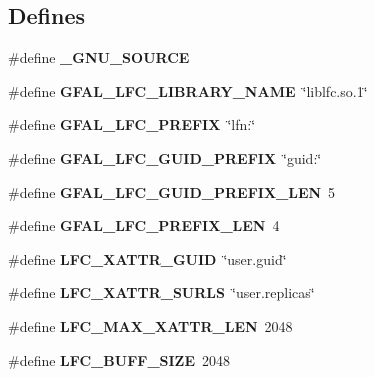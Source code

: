 \subsection*{Defines}
\begin{CompactItemize}
\item 
\#define \textbf{\_\-GNU\_\-SOURCE}\label{gfal__common__lfc_8h_53abf256730d533302d1910e5fb61efe}

\item 
\#define \textbf{GFAL\_\-LFC\_\-LIBRARY\_\-NAME}~\char`\"{}liblfc.so.1\char`\"{}\label{gfal__common__lfc_8h_7da7695351de444e2e18371bb8d6aea5}

\item 
\#define \textbf{GFAL\_\-LFC\_\-PREFIX}~\char`\"{}lfn:\char`\"{}\label{gfal__common__lfc_8h_c00d877428b39b35b4f611656b2d5215}

\item 
\#define \textbf{GFAL\_\-LFC\_\-GUID\_\-PREFIX}~\char`\"{}guid:\char`\"{}\label{gfal__common__lfc_8h_26b46ea74b4efcdd46ce519863bdc90f}

\item 
\#define \textbf{GFAL\_\-LFC\_\-GUID\_\-PREFIX\_\-LEN}~5\label{gfal__common__lfc_8h_4609690cfa23a9bb0a209f745f183c9d}

\item 
\#define \textbf{GFAL\_\-LFC\_\-PREFIX\_\-LEN}~4\label{gfal__common__lfc_8h_0f0b96660a7e6440a6556909e7195109}

\item 
\#define \textbf{LFC\_\-XATTR\_\-GUID}~\char`\"{}user.guid\char`\"{}\label{gfal__common__lfc_8h_8f6afce6b30cd0685eaa45170f52c98e}

\item 
\#define \textbf{LFC\_\-XATTR\_\-SURLS}~\char`\"{}user.replicas\char`\"{}\label{gfal__common__lfc_8h_c1963dd5788b4452446d741e07e7f417}

\item 
\#define \textbf{LFC\_\-MAX\_\-XATTR\_\-LEN}~2048\label{gfal__common__lfc_8h_cb8d26c67c686b15d05f59def23e1356}

\item 
\#define \textbf{LFC\_\-BUFF\_\-SIZE}~2048\label{gfal__common__lfc_8h_90255f6e7148a56a2c09cc15098643d5}

\end{CompactItemize}
